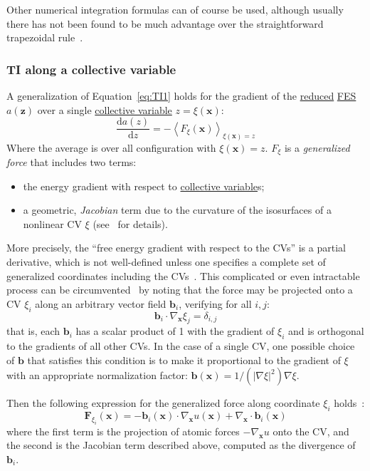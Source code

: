 \documentclass[9pt,review]{livecoms}
\newcommand{\vx}{\mathbf{x}}
\newcommand{\vz}{\mathbf{z}}
\newcommand{\vF}{\mathbf{F}}
\newcommand{\vb}{\mathbf{b}}
\begin{document}
Other numerical integration formulas can of course be used, although usually there has not been found to be much advantage over the straightforward trapezoidal rule~\cite{Paliwal_comparison_2011}. 


\subsubsection{TI along a collective variable}

A generalization of Equation~\ref{eq:TI1} holds for the gradient of the \hyperlink{ref:reduced} {reduced} \hyperlink{ref:FES} {FES} $a(\vz)$ over a single \hyperlink{ref:CV} {collective variable} $z = \xi(\vx)$:
\begin{equation}
\frac{\mathrm{d} a(z)}{\mathrm{d} z} = - \left\langle F_\xi(\vx)  \right\rangle_{\xi(\vx) = z}
    \label{eq:TI_CV}
\end{equation}
Where the average is over all configuration with $\xi(\vx) = z$. 
$F_\xi$ is a \textit{generalized force} that includes two terms:
\begin{itemize}
    \item the energy gradient with respect to \hyperlink{ref:CV} {collective variable}s;
    \item a geometric, \textit{Jacobian} term due to the curvature of the isosurfaces of a nonlinear CV $\xi$ (see~\cite{lelievre-rousset-stoltz-07-a, Henin2010a, Comer2015} for details).
\end{itemize}

More precisely, the ``free energy gradient with respect to the CVs'' is a partial derivative, which is not well-defined unless one specifies a complete set of generalized coordinates including the CVs~\cite{Henin2004}.
This complicated or even intractable process can be circumvented~\cite{denOtter2000, Ciccotti2005} by noting that the force may be projected onto a CV $\xi_i$ along an arbitrary vector field  $\vb_i$, verifying for all $i,j$:
\begin{equation}
    \vb_i \cdot \nabla_\vx \xi_j = \delta_{i,j}
\end{equation}
that is, each $\vb_i$ has a scalar product of 1 with the gradient of $\xi_i$ and is orthogonal to the gradients of all other CVs.
In the case of a single CV, one possible choice of $\vb$ that satisfies this condition is to make it proportional to the gradient of $\xi$ with an appropriate normalization factor:
$ \vb(\vx) = 1/(|\nabla \xi|^2) \nabla \xi$.

Then the following expression for the generalized force along coordinate $\xi_i$ holds~\cite{Ciccotti2005}:
\begin{equation}
\label{eq:TI_Ciccotti}
\vF_{\xi_i}(\vx) = - \vb_i(\vx) \cdot \nabla_\vx u(\vx) + \nabla_\vx \cdot \vb_i(\vx)
\end{equation}
where the first term is the projection of atomic forces $-\nabla_\vx u$ onto the CV, and the second is the Jacobian term described above, computed as the divergence of $\vb_i$.
\end{document}
